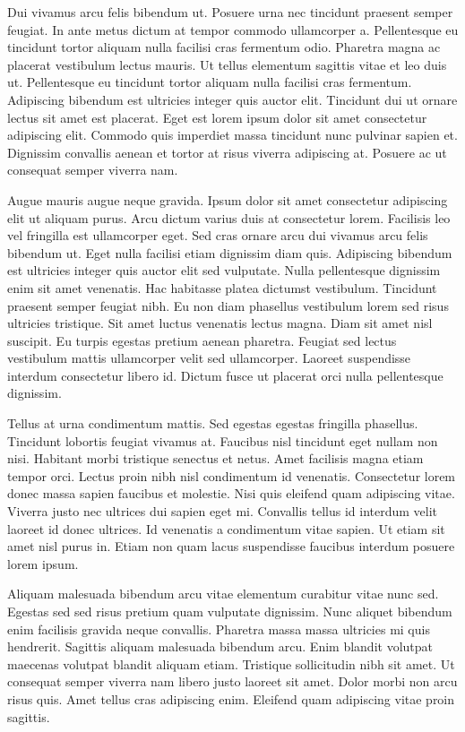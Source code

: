 \documentclass[11pt,a4paper]{article}
\begin{document}
Dui vivamus arcu felis bibendum ut. Posuere urna nec tincidunt praesent semper feugiat. In ante metus dictum at tempor commodo ullamcorper a. Pellentesque eu tincidunt tortor aliquam nulla facilisi cras fermentum odio. Pharetra magna ac placerat vestibulum lectus mauris. Ut tellus elementum sagittis vitae et leo duis ut. Pellentesque eu tincidunt tortor aliquam nulla facilisi cras fermentum. Adipiscing bibendum est ultricies integer quis auctor elit. Tincidunt dui ut ornare lectus sit amet est placerat. Eget est lorem ipsum dolor sit amet consectetur adipiscing elit. Commodo quis imperdiet massa tincidunt nunc pulvinar sapien et. Dignissim convallis aenean et tortor at risus viverra adipiscing at. Posuere ac ut consequat semper viverra nam.

Augue mauris augue neque gravida. Ipsum dolor sit amet consectetur adipiscing elit ut aliquam purus. Arcu dictum varius duis at consectetur lorem. Facilisis leo vel fringilla est ullamcorper eget. Sed cras ornare arcu dui vivamus arcu felis bibendum ut. Eget nulla facilisi etiam dignissim diam quis. Adipiscing bibendum est ultricies integer quis auctor elit sed vulputate. Nulla pellentesque dignissim enim sit amet venenatis. Hac habitasse platea dictumst vestibulum. Tincidunt praesent semper feugiat nibh. Eu non diam phasellus vestibulum lorem sed risus ultricies tristique. Sit amet luctus venenatis lectus magna. Diam sit amet nisl suscipit. Eu turpis egestas pretium aenean pharetra. Feugiat sed lectus vestibulum mattis ullamcorper velit sed ullamcorper. Laoreet suspendisse interdum consectetur libero id. Dictum fusce ut placerat orci nulla pellentesque dignissim.

Tellus at urna condimentum mattis. Sed egestas egestas fringilla phasellus. Tincidunt lobortis feugiat vivamus at. Faucibus nisl tincidunt eget nullam non nisi. Habitant morbi tristique senectus et netus. Amet facilisis magna etiam tempor orci. Lectus proin nibh nisl condimentum id venenatis. Consectetur lorem donec massa sapien faucibus et molestie. Nisi quis eleifend quam adipiscing vitae. Viverra justo nec ultrices dui sapien eget mi. Convallis tellus id interdum velit laoreet id donec ultrices. Id venenatis a condimentum vitae sapien. Ut etiam sit amet nisl purus in. Etiam non quam lacus suspendisse faucibus interdum posuere lorem ipsum.

Aliquam malesuada bibendum arcu vitae elementum curabitur vitae nunc sed. Egestas sed sed risus pretium quam vulputate dignissim. Nunc aliquet bibendum enim facilisis gravida neque convallis. Pharetra massa massa ultricies mi quis hendrerit. Sagittis aliquam malesuada bibendum arcu. Enim blandit volutpat maecenas volutpat blandit aliquam etiam. Tristique sollicitudin nibh sit amet. Ut consequat semper viverra nam libero justo laoreet sit amet. Dolor morbi non arcu risus quis. Amet tellus cras adipiscing enim. Eleifend quam adipiscing vitae proin sagittis.
\end{document}
